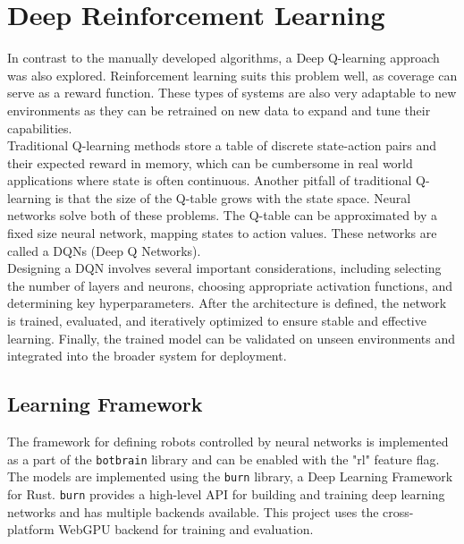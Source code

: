 \section{Deep Reinforcement Learning}
\label{sec:rl}
In contrast to the manually developed algorithms, a Deep Q-learning approach was also explored. Reinforcement learning suits this problem well, as coverage can serve as a reward function. These types of systems are also very adaptable to new environments as they can be retrained on new data to expand and tune their capabilities. \\

Traditional Q-learning methods store a table of discrete state-action pairs and their expected reward in memory, which can be cumbersome in real world applications where state is often continuous. Another pitfall of traditional Q-learning is that the size of the Q-table grows with the state space. Neural networks solve both of these problems. The Q-table can be approximated by a fixed size neural network, mapping states to action values. These networks are called a DQNs (Deep Q Networks). \\

Designing a DQN involves several important considerations, including selecting the number of layers and neurons, choosing appropriate activation functions, and determining key hyperparameters. After the architecture is defined, the network is trained, evaluated, and iteratively optimized to ensure stable and effective learning. Finally, the trained model can be validated on unseen environments and integrated into the broader system for deployment.


\subsection{Learning Framework}
The framework for defining robots controlled by neural networks is implemented as a part of the \texttt{botbrain} library and can be enabled with the "rl" feature flag. The models are implemented using the \texttt{burn} \cite{burn} library, a Deep Learning Framework for Rust. \texttt{burn} provides a high-level API for building and training deep learning networks and has multiple backends available. This project uses the cross-platform WebGPU backend \cite{wgpu} for training and evaluation. \\

